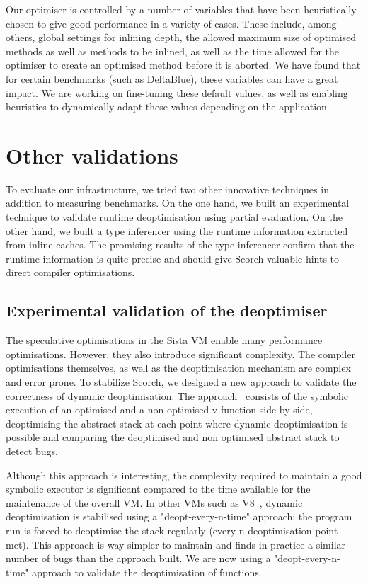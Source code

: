 \documentclass[a4paper,12pt,twoside]{../includes/ThesisStyle}
\begin{document}
Our optimiser is controlled by a number of variables that have been heuristically chosen to give good performance in a variety of cases. These include, among others, global settings for inlining depth, the allowed maximum size of optimised methods as well as methods to be inlined, as well as the time allowed for the optimiser to create an optimised method before it is aborted. We have found that for certain benchmarks (such as DeltaBlue), these variables can have a great impact. We are working on fine-tuning these default values, as well as enabling heuristics to dynamically adapt these values depending on the application.

\section{Other validations}
\label{sec:otherValid}

To evaluate our infrastructure, we tried two other innovative techniques in addition to measuring benchmarks. On the one hand, we built an experimental technique to validate runtime deoptimisation using partial evaluation. On the other hand, we built a type inferencer using the runtime information extracted from inline caches. The promising results of the type inferencer confirm that the runtime information is quite precise and should give Scorch valuable hints to direct compiler optimisations.

\subsection{Experimental validation of the deoptimiser}

The speculative optimisations in the Sista VM enable many performance optimisations. However, they also introduce significant complexity. The compiler optimisations themselves, as well as the deoptimisation mechanism are complex and error prone. To stabilize Scorch, we designed a new approach to validate the correctness of dynamic deoptimisation. The approach~\cite{Bera16a} consists of the symbolic execution of an optimised and a non optimised v-function side by side, deoptimising the abstract stack at each point where dynamic deoptimisation is possible and comparing the deoptimised and non optimised abstract stack to detect bugs. 

Although this approach is interesting, the complexity required to maintain a good symbolic executor is significant compared to the time available for the maintenance of the overall VM. In other VMs such as V8~\cite{V8}, dynamic deoptimisation is stabilised using a "deopt-every-n-time" approach: the program run is forced to deoptimise the stack regularly (every n deoptimisation point met). This approach is way simpler to maintain and finds in practice a similar number of bugs than the approach built. We are now using a "deopt-every-n-time" approach to validate the deoptimisation of functions.
\end{document}
